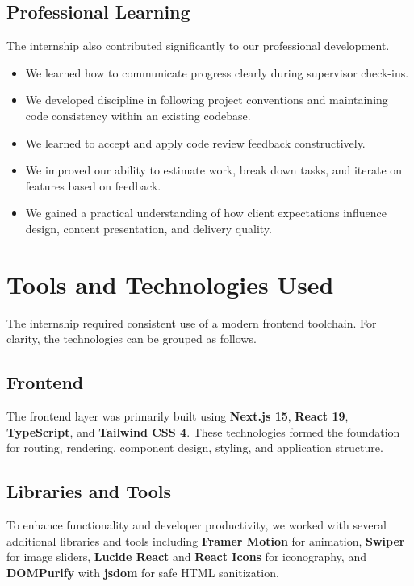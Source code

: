 \documentclass[12pt, oneside, a4paper]{book}
\begin{document}
\begin{doublespace}
\subsection{Professional Learning}

The internship also contributed significantly to our professional development.

\begin{itemize}
  \item We learned how to communicate progress clearly during supervisor check-ins.
  \item We developed discipline in following project conventions and maintaining code
  consistency within an existing codebase.
  \item We learned to accept and apply code review feedback constructively.
  \item We improved our ability to estimate work, break down tasks, and iterate on
  features based on feedback.
  \item We gained a practical understanding of how client expectations influence design,
  content presentation, and delivery quality.
\end{itemize}

\section{Tools and Technologies Used}

The internship required consistent use of a modern frontend toolchain. For clarity,
the technologies can be grouped as follows.

\subsection{Frontend}

The frontend layer was primarily built using \textbf{Next.js 15}, \textbf{React 19},
\textbf{TypeScript}, and \textbf{Tailwind CSS 4}. These technologies formed the
foundation for routing, rendering, component design, styling, and application structure.

\subsection{Libraries and Tools}

To enhance functionality and developer productivity, we worked with several additional
libraries and tools including \textbf{Framer Motion} for animation, \textbf{Swiper}
for image sliders, \textbf{Lucide React} and \textbf{React Icons} for iconography,
and \textbf{DOMPurify} with \textbf{jsdom} for safe HTML sanitization.


\end{doublespace}
\end{document}
